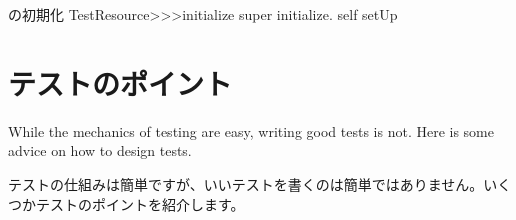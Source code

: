 \documentclass[a4paper,10pt,twoside]{book}
\begin{document}
{%
\begin{method}[restresourceinitialize]{ の初期化}
TestResource>>>initialize
	super initialize.
	self setUp
\end{method}

\section{テストのポイント}

While the mechanics of testing are easy, writing good tests is not.
Here is some advice on how to design tests.
\fi

テストの仕組みは簡単ですが、いいテストを書くのは簡単ではありません。いくつかテストのポイントを紹介します。

\begin{description}



\end{description}}
\end{document}
